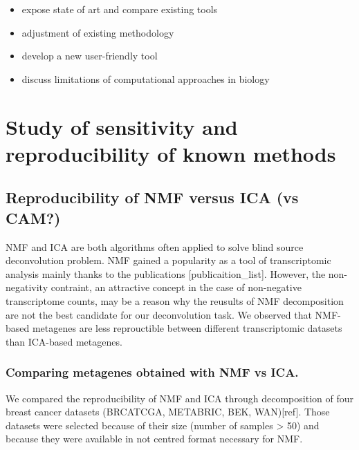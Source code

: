 \documentclass[12pt,]{book}
\providecommand{\tightlist}{%
  \setlength{\itemsep}{0pt}\setlength{\parskip}{0pt}}
\theoremstyle{definition}
\theoremstyle{definition}
\theoremstyle{definition}
\theoremstyle{remark}
\begin{document}
\begin{itemize}
\tightlist
\item
  expose state of art and compare existing tools
\item
  adjustment of existing methodology
\item
  develop a new user-friendly tool
\item
  discuss limitations of computational approaches in biology
\end{itemize}

\hypertarget{study-of-sensitivity-and-reproducibility-of-known-methods}{%
\chapter{Study of sensitivity and reproducibility of known
methods}\label{study-of-sensitivity-and-reproducibility-of-known-methods}}

\hypertarget{reproducibility-of-nmf-versus-ica-vs-cam}{%
\section{Reproducibility of NMF versus ICA (vs
CAM?)}\label{reproducibility-of-nmf-versus-ica-vs-cam}}

NMF and ICA are both algorithms often applied to solve blind source
deconvolution problem. NMF gained a popularity as a tool of
transcriptomic analysis mainly thanks to the publications
{[}publicaition\_list{]}. However, the non-negativity contraint, an
attractive concept in the case of non-negative transcriptome counts, may
be a reason why the reusults of NMF decomposition are not the best
candidate for our deconvolution task. We observed that NMF-based
metagenes are less reprouctible between different transcriptomic
datasets than ICA-based metagenes.

\hypertarget{comparing-metagenes-obtained-with-nmf-vs-ica.}{%
\subsection{Comparing metagenes obtained with NMF vs
ICA.}\label{comparing-metagenes-obtained-with-nmf-vs-ica.}}

We compared the reproducibility of NMF and ICA through decomposition of
four breast cancer datasets (BRCATCGA, METABRIC, BEK, WAN){[}ref{]}.
Those datasets were selected because of their size (number of samples
\textgreater{} 50) and because they were available in not centred format
necessary for NMF.
\end{document}
